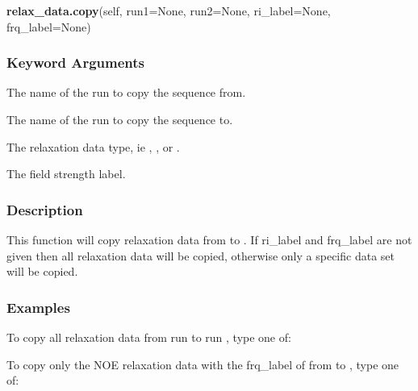 \textsf{\textbf{relax\_data.copy}(self, run1=None, run2=None, ri\_label=None, frq\_label=None)}


\subsubsection{Keyword Arguments}


  The name of the run to copy  the sequence  from.

  The name of the run to copy  the sequence  to.

  The relaxation  data type, ie 
, 
, or 
.

  The field strength label.

\subsubsection{Description}

This function will copy  relaxation  data from 
 to 
.  If ri\_label and frq\_label
are not given then all relaxation  data will be copied, otherwise only a specific data set
will be copied.


\subsubsection{Examples}

To copy  all relaxation  data from run 
 to run 
, type one of:






To copy  only the NOE relaxation  data with the frq\_label of 
 from 
 to 
, type one
of:





